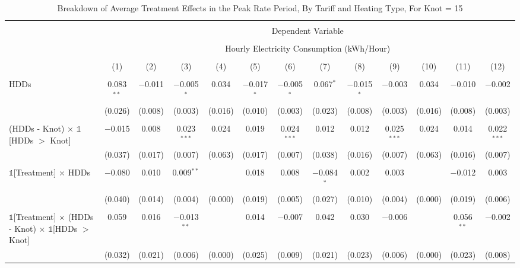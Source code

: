 
\begin{table}[!htbp] \centering 
  \caption{Breakdown of Average Treatment Effects in the Peak Rate Period, By Tariff and Heating Type, For Knot = 15} 
  \label{Table:Breakdown-of-Average-Treatment-Effects-in-the-Peak-Rate-Period_By-Tariff-and-Heating-Type_Knot-15} 
\small 
\begin{tabular}{@{\extracolsep{20pt}}lcccccccccccc} 
\\[-1.8ex]\hline 
\hline \\[-1.8ex] 
 & \multicolumn{12}{c}{Dependent Variable} \\ 
\cline{2-13} 
\\[-1.8ex] & \multicolumn{12}{c}{Hourly Electricity Consumption  (kWh/Hour)} \\ 
\\[-1.8ex] & (1) & (2) & (3) & (4) & (5) & (6) & (7) & (8) & (9) & (10) & (11) & (12)\\ 
\hline \\[-1.8ex] 
 HDDs & 0.083$^{**}$ & $-$0.011 & $-$0.005$^{*}$ & 0.034 & $-$0.017$^{*}$ & $-$0.005$^{*}$ & 0.067$^{*}$ & $-$0.015$^{*}$ & $-$0.003 & 0.034 & $-$0.010 & $-$0.002 \\ 
  & (0.026) & (0.008) & (0.003) & (0.016) & (0.010) & (0.003) & (0.023) & (0.008) & (0.003) & (0.016) & (0.008) & (0.003) \\ 
  & & & & & & & & & & & & \\ 
 (HDDs - Knot) $\times$ $\mathbb{1}$[HDDs $>$ Knot] & $-$0.015 & 0.008 & 0.023$^{***}$ & 0.024 & 0.019 & 0.024$^{***}$ & 0.012 & 0.012 & 0.025$^{***}$ & 0.024 & 0.014 & 0.022$^{***}$ \\ 
  & (0.037) & (0.017) & (0.007) & (0.063) & (0.017) & (0.007) & (0.038) & (0.016) & (0.007) & (0.063) & (0.016) & (0.007) \\ 
  & & & & & & & & & & & & \\ 
 $\mathbb{1}$[Treatment] $\times$ HDDs & $-$0.080 & 0.010 & 0.009$^{**}$ &  & 0.018 & 0.008 & $-$0.084$^{*}$ & 0.002 & 0.003 &  & $-$0.012 & 0.003 \\ 
  & (0.040) & (0.014) & (0.004) & (0.000) & (0.019) & (0.005) & (0.027) & (0.010) & (0.004) & (0.000) & (0.019) & (0.006) \\ 
  & & & & & & & & & & & & \\ 
 $\mathbb{1}$[Treatment] $\times$ (HDDs - Knot) $\times$ $\mathbb{1}$[HDDs $>$ Knot] & 0.059 & 0.016 & $-$0.013$^{**}$ &  & 0.014 & $-$0.007 & 0.042 & 0.030 & $-$0.006 &  & 0.056$^{**}$ & $-$0.002 \\ 
  & (0.032) & (0.021) & (0.006) & (0.000) & (0.025) & (0.009) & (0.021) & (0.023) & (0.006) & (0.000) & (0.023) & (0.008) \\ 

\end{tabular}
\end{table}
